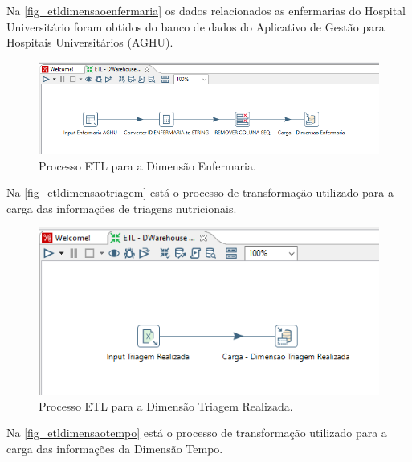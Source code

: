 Na \autoref{fig_etldimensaoenfermaria} os dados relacionados as enfermarias do Hospital Universitário foram obtidos do banco de dados do Aplicativo de Gestão para Hospitais Universitários (AGHU). 
\begin{figure}[htb]
	\caption{\label{fig_etldimensaoenfermaria}Processo ETL para a Dimensão Enfermaria.}
	\begin{center}
	    \includegraphics[scale=0.8]{Imagens/figura - etl dw enfermaria.png}
	\end{center}
\end{figure}

Na \autoref{fig_etldimensaotriagem} está o processo de transformação utilizado para a carga das informações de triagens nutricionais.

\begin{figure}[htb]
	\caption{\label{fig_etldimensaotriagem}Processo ETL para a Dimensão Triagem Realizada.}
	\begin{center}
	    \includegraphics[scale=0.7]{Imagens/figura - etl dw triagem.png}
	\end{center}
\end{figure}

Na \autoref{fig_etldimensaotempo} está o processo de transformação utilizado para a carga das informações da Dimensão Tempo.


